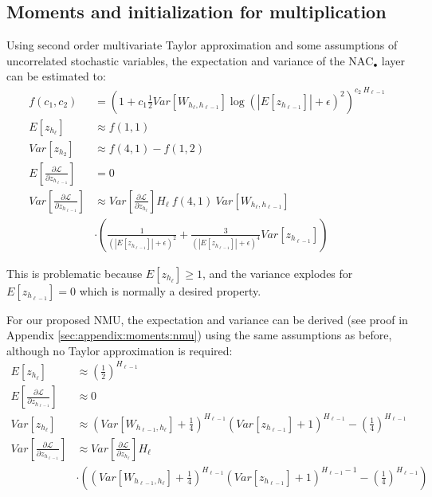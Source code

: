 \subsection{Moments and initialization for multiplication}

Using second order multivariate Taylor approximation and some assumptions of uncorrelated stochastic variables, the expectation and variance of the $\mathrm{NAC}_{\bullet}$ layer can be estimated to:
\begin{equation}
\begin{aligned}
f(c_1, c_2) &= \left(1 + c_1 \frac{1}{2} Var[W_{h_\ell, h_{\ell-1}}] \log(|E[z_{h_{\ell-1}}]| + \epsilon)^2\right)^{c_2\ H_{\ell-1}} \\
E[z_{h_\ell}] &\approx f\left(1, 1\right) \\
Var[z_{h_2}] &\approx f\left(4, 1\right) - f\left(1, 2\right) \\
E\left[\frac{\partial \mathcal{L}}{\partial z_{h_{\ell-1}}}\right] &= 0 \\
Var\left[\frac{\partial \mathcal{L}}{\partial z_{h_{\ell-1}}}\right] &\approx Var\left[\frac{\partial \mathcal{L}}{\partial z_{h_{\ell}}}\right] H_{\ell}\ f\left(4, 1\right)\ Var[W_{h_{\ell}, h_{\ell-1}}] \\
&\cdot \left(\frac{1}{\left(|E[z_{h_{\ell-1}}]| + \epsilon\right)^2} + \frac{3}{\left(|E[z_{h_{\ell-1}}]| + \epsilon\right)^4} Var[z_{h_{\ell-1}}]\right)
\end{aligned}
\end{equation}

This is problematic because $E[z_{h_\ell}] \ge 1$, and the variance explodes for $E[z_{h_{\ell-1}}] = 0$ which is normally a desired property.

For our proposed NMU, the expectation and variance can be derived (see proof in Appendix \ref{sec:appendix:moments:nmu}) using the same assumptions as before, although no Taylor approximation is required:
\begin{equation}
\begin{aligned}
E[z_{h_\ell}] &\approx \left(\frac{1}{2}\right)^{H_{\ell-1}} \\
E\left[\frac{\partial \mathcal{L}}{\partial z_{h_{\ell-1}}}\right] &\approx 0 \\
Var[z_{h_\ell}] &\approx \left(Var[W_{h_{\ell-1},h_\ell}] + \frac{1}{4}\right)^{H_{\ell-1}} \left(Var[z_{h_{\ell-1}}] + 1\right)^{H_{\ell-1}} - \left(\frac{1}{4}\right)^{H_{\ell-1}} \\
Var\left[\frac{\partial \mathcal{L}}{\partial z_{h_{\ell-1}}}\right] &\approx Var\left[\frac{\partial \mathcal{L}}{\partial z_{h_\ell}}\right] H_\ell \\
& \cdot \left( \left(Var[W_{h_{\ell-1},h_\ell}] + \frac{1}{4}\right)^{H_{\ell-1}} \left(Var[z_{h_{\ell-1}}] + 1\right)^{H_{\ell-1}-1} - \left(\frac{1}{4}\right)^{H_{\ell-1}}\right)
\end{aligned}
\end{equation}


